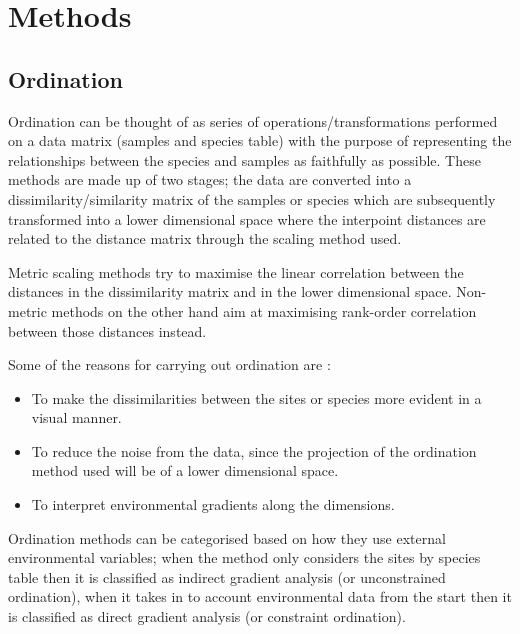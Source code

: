 
\chapter{Methods}

\ifpdf
    \graphicspath{{Chapter2/Figs/Raster/}{Chapter2/Figs/PDF/}{Chapter2/Figs/}}
\else
    \graphicspath{{Chapter2/Figs/Vector/}{Chapter2/Figs/}}
\fi


\section{Ordination}

Ordination can be thought of as series of operations/transformations performed on a data matrix (samples and species table) with the purpose of representing the relationships between the species and samples as faithfully as possible. These methods are made up of two stages; the data are converted into a dissimilarity/similarity matrix of the samples or species which are subsequently transformed into a lower dimensional space where the interpoint distances are related to the distance matrix through the scaling method used.

Metric scaling methods try to maximise the linear correlation between the distances in the dissimilarity matrix and in the lower dimensional space. Non-metric methods on the other hand aim at maximising rank-order correlation between those distances instead.

Some of the reasons for carrying out ordination are :
\begin{itemize}
\item To make the dissimilarities between the sites or species more evident in a visual manner.
\item To reduce the noise from the data, since the projection of the ordination method used will be of a lower dimensional space.
\item To interpret environmental gradients along the dimensions.
\end{itemize}


Ordination methods can be categorised based on how they use external environmental variables; when the method only considers the sites by species table then it is classified as indirect gradient analysis (or unconstrained ordination), when it takes in to account environmental data from the start then it is classified as direct gradient analysis (or constraint ordination). 

